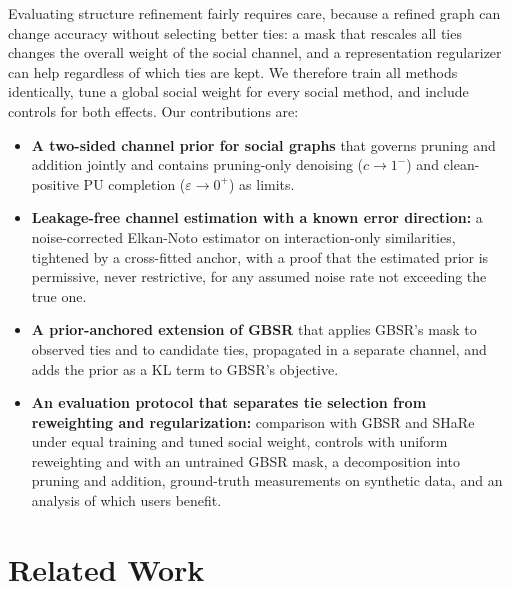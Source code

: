\documentclass[sigconf]{acmart}
\begin{document}
Evaluating structure refinement fairly requires care, because a refined graph can change accuracy without selecting better ties: a mask that rescales all ties changes the overall weight of the social channel, and a representation regularizer can help regardless of which ties are kept. We therefore train all methods identically, tune a global social weight for every social method, and include controls for both effects. Our contributions are:
\begin{itemize}
    \item \textbf{A two-sided channel prior for social graphs} that governs pruning and addition jointly and contains pruning-only denoising ($c \to 1^-$) and clean-positive PU completion ($\varepsilon \to 0^+$) as limits.
    \item \textbf{Leakage-free channel estimation with a known error direction:} a noise-corrected Elkan-Noto estimator on interaction-only similarities, tightened by a cross-fitted anchor, with a proof that the estimated prior is permissive, never restrictive, for any assumed noise rate not exceeding the true one.
    \item \textbf{A prior-anchored extension of GBSR} that applies GBSR's mask to observed ties and to candidate ties, propagated in a separate channel, and adds the prior as a KL term to GBSR's objective.
    \item \textbf{An evaluation protocol that separates tie selection from reweighting and regularization:} comparison with GBSR and SHaRe under equal training and tuned social weight, controls with uniform reweighting and with an untrained GBSR mask, a decomposition into pruning and addition, ground-truth measurements on synthetic data, and an analysis of which users benefit.
\end{itemize}

\section{Related Work}
\end{document}
